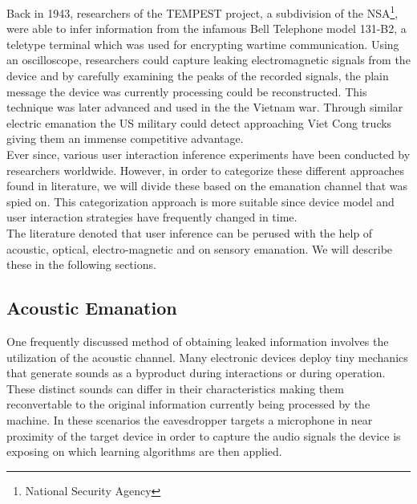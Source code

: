 Back in 1943, researchers of the TEMPEST project, a subdivision of the NSA\footnote{National Security Agency}, were able to infer information from the infamous Bell Telephone model 131-B2, a teletype terminal which was used for encrypting wartime communication. Using an oscilloscope, researchers could capture leaking electromagnetic signals from the device and by carefully examining the peaks of the recorded signals, the plain message the device was currently processing could be reconstructed. This technique was later advanced and used in the the Vietnam war. Through similar electric emanation the US military could detect approaching Viet Cong trucks giving them an immense competitive advantage. \\


Ever since, various user interaction inference experiments have been conducted by researchers worldwide. However, in order to categorize these different approaches found in literature, we will divide these based on the emanation channel that was spied on. This categorization approach is more suitable since device model and user interaction strategies have frequently changed in time.\\ 

The literature denoted that user inference can be perused with the help of acoustic, optical, electro-magnetic and on sensory emanation. We will describe these in the following sections.

\subsection{Acoustic Emanation}
One frequently discussed method of obtaining leaked information involves the utilization of the acoustic channel. Many electronic devices deploy tiny mechanics that generate sounds as a byproduct during interactions or during operation. These distinct sounds can differ in their characteristics making them reconvertable to the original information currently being processed by the machine. In these scenarios the eavesdropper targets a microphone in near proximity of the target device in order to capture the audio signals the device is exposing on which learning algorithms are then applied. \\

